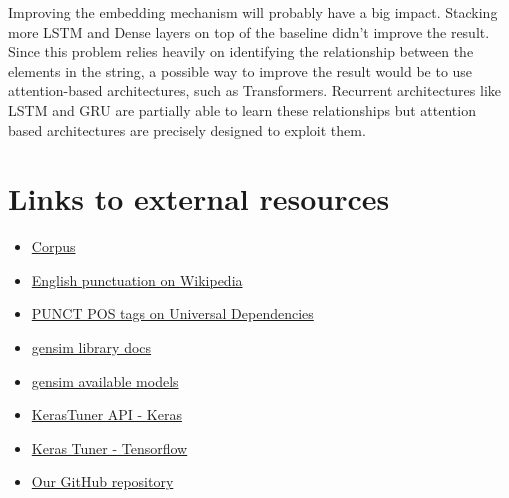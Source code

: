 \documentclass[11pt]{article}
\begin{document}

Improving the embedding mechanism will probably have a big impact. Stacking more LSTM and Dense layers on top of the baseline didn't improve the result. Since this problem relies heavily on identifying the relationship between the elements in the string, a possible way to improve the result would be to use attention-based architectures, such as Transformers. Recurrent architectures like LSTM and GRU are partially able to learn these relationships but attention based architectures are precisely designed to exploit them.
 
\section{Links to external resources}
\label{sec:links}
\begin{itemize}[noitemsep,nolistsep]
    \item \href{https://raw.githubusercontent.com/nltk/nltk_data/gh-pages/packages/corpora/dependency_treebank.zip}{Corpus}
    \item \href{https://en.wikipedia.org/wiki/English_punctuation}{English punctuation on Wikipedia}
    \item \href{https://universaldependencies.org/docs/en/pos/all.html#al-en-pos/PUNCT}{PUNCT POS tags on Universal Dependencies}
    \item \href{https://radimrehurek.com/gensim/auto_examples/index.html}{gensim library docs}
    \item \href{https://github.com/RaRe-Technologies/gensim-data#models}{gensim available models}
    \item \href{https://keras.io/api/keras_tuner/}{KerasTuner API - Keras}
    \item \href{https://www.tensorflow.org/tutorials/keras/keras_tuner}{Keras Tuner - Tensorflow}
    \item \href{https://github.com/Danysan1/ai-unibo-nlp-project}{Our GitHub repository}
\end{itemize}

%


\end{document}
